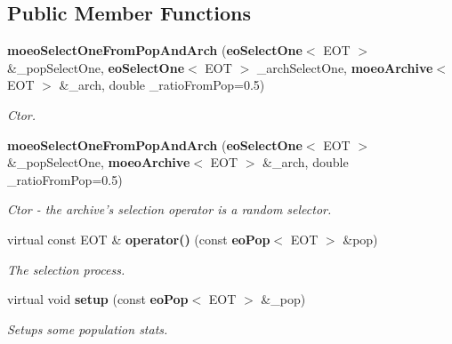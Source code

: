 \subsection*{Public Member Functions}
\begin{CompactItemize}
\item 
{\bf moeo\-Select\-One\-From\-Pop\-And\-Arch} ({\bf eo\-Select\-One}$<$ EOT $>$ \&\_\-pop\-Select\-One, {\bf eo\-Select\-One}$<$ EOT $>$ \_\-arch\-Select\-One, {\bf moeo\-Archive}$<$ EOT $>$ \&\_\-arch, double \_\-ratio\-From\-Pop=0.5)
\begin{CompactList}\small\item\em Ctor. \item\end{CompactList}\item 
{\bf moeo\-Select\-One\-From\-Pop\-And\-Arch} ({\bf eo\-Select\-One}$<$ EOT $>$ \&\_\-pop\-Select\-One, {\bf moeo\-Archive}$<$ EOT $>$ \&\_\-arch, double \_\-ratio\-From\-Pop=0.5)
\begin{CompactList}\small\item\em Ctor - the archive's selection operator is a random selector. \item\end{CompactList}\item 
virtual const EOT \& {\bf operator()} (const {\bf eo\-Pop}$<$ EOT $>$ \&pop)\label{classmoeoSelectOneFromPopAndArch_3c97abfde2dd9959ae4db4c32038017d}

\begin{CompactList}\small\item\em The selection process. \item\end{CompactList}\item 
virtual void {\bf setup} (const {\bf eo\-Pop}$<$ EOT $>$ \&\_\-pop)\label{classmoeoSelectOneFromPopAndArch_a2acc5ddcf045c0c63c22f8d04274858}

\begin{CompactList}\small\item\em Setups some population stats. \item\end{CompactList}\end{CompactItemize}
